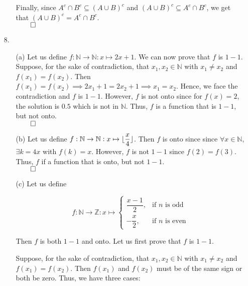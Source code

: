 \documentclass[11pt]{article}
\DeclarePairedDelimiter\floor{\lfloor}{\rfloor}
\begin{document}
\begin{itemize}
\begin{itemize}
        Finally, since $A^c \cap B^c \subseteq (A \cup B)^c$ and $(A \cup B)^c
        \subseteq A^c \cap B^c$, we get that $(A \cup B)^c = A^c \cap B^c$.\\
        $\qed$
    \end{itemize}

    \item[8.]
        \begin{itemize}
            \item[(a)]
            Let us define $f : \mathbb{N} \to \mathbb{N} : x \mapsto 2x + 1$.
            We can now prove that $f$ is $1 - 1$. Suppose, for the sake of
            contradiction, that $x_1, x_2 \in \mathbb{N}$ with $x_1 \neq x_2$
            and $f(x_1) = f(x_2)$. Then $f(x_1) = f(x_2) \implies 2x_1 + 1 =
            2x_2 + 1 \implies x_1 = x_2$. Hence, we face the contradiction and
            $f$ is $1 - 1$. However, $f$ is not onto since for $f(x) = 2$, the
            solution is $0.5$ which is not in $\mathbb{N}$. Thus, $f$ is a
            function that is $1 - 1$, but not onto.\\
            $\qed$

            \item[(b)]
            Let us define $f : \mathbb{N} \rightarrow \mathbb{N} : x \mapsto
            \floor{\dfrac{x}{4}}$. Then $f$ is onto since since $\forall x \in
            \mathbb{N}$, $\exists k = 4x$ with $f(k) = x$. However, $f$ is not
            $1 - 1$ since $f(2) = f(3)$. Thus, $f$ if a function that is onto,
            but not $1 - 1$.\\
            $\qed$

            \item[(c)]
            Let us define

            \begin{equation}
                f : \mathbb{N} \rightarrow \mathbb{Z} : x \mapsto
                \begin{cases}
                    \dfrac{x - 1}{2}, & \text{if } n \text{ is odd}\\
                    -\dfrac{x}{2},    & \text{if } n \text{ is even}
                \end{cases}
            \end{equation}

            Then $f$ is both $1 - 1$ and onto.
            Let us first prove that $f$ is $1 - 1$.

            Suppose, for the sake of contradiction, that $x_1, x_2 \in
            \mathbb{N}$ with $x_1 \neq x_2$ and $f(x_1) = f(x_2)$. Then
            $f(x_1)$ and $f(x_2)$ must be of the same sign or both be zero.
            Thus, we have three cases:


\end{itemize}
\end{itemize}
\end{document}
